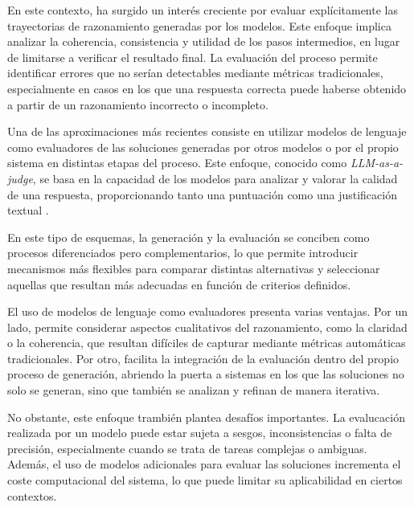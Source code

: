 \documentclass[12pt,a4paper,twoside,openright]{book}
\begin{document}
En este contexto, ha surgido un interés creciente por evaluar explícitamente las trayectorias de razonamiento generadas por los modelos. Este enfoque implica analizar la coherencia, consistencia y utilidad de los pasos intermedios, en lugar de
limitarse a verificar el resultado final. La evaluación del proceso permite identificar errores que no serían detectables mediante métricas tradicionales, especialmente en casos en los que una respuesta correcta puede haberse obtenido a partir
de un razonamiento incorrecto o incompleto.

Una de las aproximaciones más recientes consiste en utilizar modelos de lenguaje como evaluadores de las soluciones generadas por otros modelos o por el propio sistema en distintas etapas del proceso. Este enfoque, conocido como
\emph{LLM-as-a-judge}, se basa en la capacidad de los modelos para analizar y valorar la calidad de una respuesta, proporcionando tanto una puntuación como una justificación textual \cite{zheng2023judging}.


En este tipo de esquemas, la generación y la evaluación se conciben como procesos diferenciados pero complementarios, lo que permite introducir mecanismos más flexibles para comparar distintas alternativas y seleccionar aquellas que resultan más
adecuadas en función de criterios definidos.

El uso de modelos de lenguaje como evaluadores presenta varias ventajas. Por un lado, permite considerar aspectos cualitativos del razonamiento, como la claridad o la coherencia, que resultan difíciles de capturar mediante métricas automáticas
tradicionales. Por otro, facilita la integración de la evaluación dentro del propio proceso de generación, abriendo la puerta a sistemas en los que las soluciones no solo se generan, sino que también se analizan y refinan de manera iterativa.

No obstante, este enfoque trambién plantea desafíos importantes. La evalucación realizada por un modelo puede estar sujeta a sesgos, inconsistencias o falta de precisión, especialmente cuando se trata de tareas complejas o ambiguas. Además,
el uso de modelos adicionales para evaluar las soluciones incrementa el coste computacional del sistema, lo que puede limitar su aplicabilidad en ciertos contextos.
\end{document}
